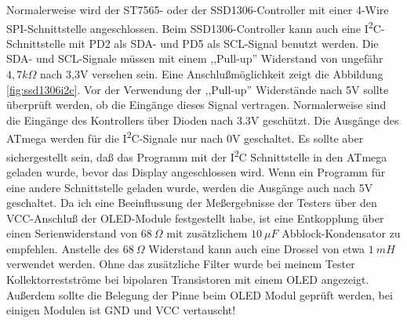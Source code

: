 Normalerweise wird der ST7565- oder der SSD1306-Controller mit einer 4-Wire SPI-Schnittstelle angeschlossen.
Beim SSD1306-Controller kann auch eine I\textsuperscript{2}C-Schnittstelle mit PD2 als SDA- und PD5 als SCL-Signal benutzt werden.
Die SDA- und SCL-Signale müssen mit einem ,,Pull-up'' Widerstand von ungefähr \(4,7k\Omega\) nach 3,3V versehen sein.
Eine Anschlußmöglichkeit zeigt die Abbildung \ref{fig:ssd1306i2c}.
Vor der Verwendung der ,,Pull-up'' Widerstände nach 5V sollte überprüft werden, ob die Eingänge dieses Signal vertragen.
Normalerweise sind die Eingänge des Kontrollers über Dioden nach 3.3V geschützt.
Die Ausgänge des ATmega werden für die I\textsuperscript{2}C-Signale nur nach 0V geschaltet.
Es sollte aber sichergestellt sein, daß das Programm mit der I\textsuperscript{2}C Schnittstelle in den ATmega geladen wurde,
bevor das Display angeschlossen wird. Wenn ein Programm für eine andere Schnittstelle geladen wurde,
werden die Ausgänge auch nach 5V geschaltet.
Da ich eine Beeinflussung der Meßergebnisse der Testers über den VCC-Anschluß der OLED-Module festgestellt habe, 
ist eine Entkopplung über einen Serienwiderstand von \(68~\Omega\) mit zusätzlichem \(10~\mu F\)
 Abblock-Kondensator zu empfehlen. 
Anstelle des \(68~\Omega\) Widerstand kann auch eine Drossel von etwa \(1~mH\) verwendet werden.
Ohne das zusätzliche Filter wurde bei meinem Tester Kollektorrestströme bei bipolaren Transistoren mit einem OLED angezeigt.
Außerdem sollte die Belegung der Pinne beim OLED Modul geprüft werden, bei einigen Modulen ist GND und VCC vertauscht!
 

